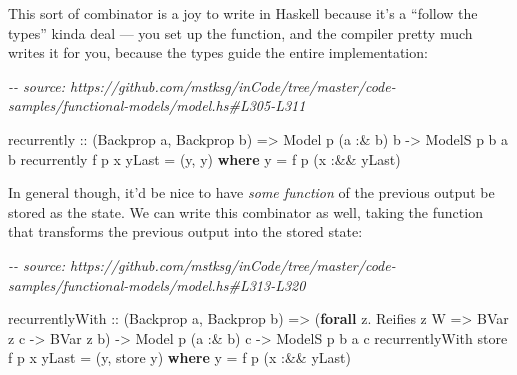 \documentclass[]{article}
\newenvironment{Shaded}{}{}
\newcommand{\CommentTok}[1]{\textcolor[rgb]{0.38,0.63,0.69}{\textit{#1}}}
\newcommand{\DataTypeTok}[1]{\textcolor[rgb]{0.56,0.13,0.00}{#1}}
\newcommand{\KeywordTok}[1]{\textcolor[rgb]{0.00,0.44,0.13}{\textbf{#1}}}
\newcommand{\NormalTok}[1]{#1}
\newcommand{\OperatorTok}[1]{\textcolor[rgb]{0.40,0.40,0.40}{#1}}
\newcommand{\OtherTok}[1]{\textcolor[rgb]{0.00,0.44,0.13}{#1}}
\begin{document}
This sort of combinator is a joy to write in Haskell because it's a ``follow the
types'' kinda deal --- you set up the function, and the compiler pretty much
writes it for you, because the types guide the entire implementation:

\begin{Shaded}
\begin{Highlighting}[]
\CommentTok{{-}{-} source: https://github.com/mstksg/inCode/tree/master/code{-}samples/functional{-}models/model.hs\#L305{-}L311}

\NormalTok{recurrently}
\OtherTok{    ::}\NormalTok{ (}\DataTypeTok{Backprop}\NormalTok{ a, }\DataTypeTok{Backprop}\NormalTok{ b)}
    \OtherTok{=\textgreater{}} \DataTypeTok{Model}\NormalTok{  p   (a }\OperatorTok{:\&}\NormalTok{ b) b}
    \OtherTok{{-}\textgreater{}} \DataTypeTok{ModelS}\NormalTok{ p b  a       b}
\NormalTok{recurrently f p x yLast }\OtherTok{=}\NormalTok{ (y, y)}
  \KeywordTok{where}
\NormalTok{    y }\OtherTok{=}\NormalTok{ f p (x }\OperatorTok{:\&\&}\NormalTok{ yLast)}
\end{Highlighting}
\end{Shaded}

In general though, it'd be nice to have \emph{some function} of the previous
output be stored as the state. We can write this combinator as well, taking the
function that transforms the previous output into the stored state:

\begin{Shaded}
\begin{Highlighting}[]
\CommentTok{{-}{-} source: https://github.com/mstksg/inCode/tree/master/code{-}samples/functional{-}models/model.hs\#L313{-}L320}

\NormalTok{recurrentlyWith}
\OtherTok{    ::}\NormalTok{ (}\DataTypeTok{Backprop}\NormalTok{ a, }\DataTypeTok{Backprop}\NormalTok{ b)}
    \OtherTok{=\textgreater{}}\NormalTok{ (}\KeywordTok{forall}\NormalTok{ z}\OperatorTok{.} \DataTypeTok{Reifies}\NormalTok{ z }\DataTypeTok{W} \OtherTok{=\textgreater{}} \DataTypeTok{BVar}\NormalTok{ z c }\OtherTok{{-}\textgreater{}} \DataTypeTok{BVar}\NormalTok{ z b)}
    \OtherTok{{-}\textgreater{}} \DataTypeTok{Model}\NormalTok{  p   (a }\OperatorTok{:\&}\NormalTok{ b) c}
    \OtherTok{{-}\textgreater{}} \DataTypeTok{ModelS}\NormalTok{ p b  a       c}
\NormalTok{recurrentlyWith store f p x yLast }\OtherTok{=}\NormalTok{ (y, store y)}
  \KeywordTok{where}
\NormalTok{    y }\OtherTok{=}\NormalTok{ f p (x }\OperatorTok{:\&\&}\NormalTok{ yLast)}
\end{Highlighting}
\end{Shaded}
\end{document}
